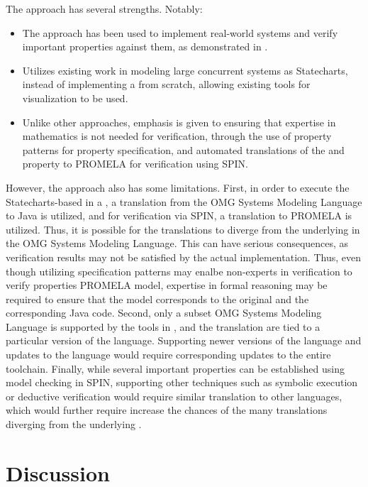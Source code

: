 The \MDA{} approach has several strengths. Notably:
\begin{itemize}
  \item The approach has been used to implement real-world
    systems and verify important properties against them,
    as demonstrated in \cite{PorresECBS08}.
  \item Utilizes existing work in modeling large concurrent
    systems as Statecharts, instead of implementing a \DSL{} from
    scratch, allowing existing tools for visualization to be used.
  \item Unlike other approaches, emphasis is given to ensuring
    that expertise in mathematics is not needed for verification,
    through the use of property patterns for property specification,
    and automated translations of the \BPG{} and property to PROMELA
    for verification using SPIN.
\end{itemize}

However, the approach also has some limitations. First, in order to execute the
Statecharts-based \BPG{} in a \CDSS{}, a translation from the OMG Systems
Modeling Language \cite{OMGSpecUrl} to Java is utilized, and for
verification via SPIN, a translation to PROMELA is utilized. Thus, it
is possible for the translations to diverge from the underlying \BPG{}
in the OMG Systems Modeling Language. This can have serious
consequences, as verification results may not be satisfied by the actual
implementation. Thus, even though utilizing specification patterns
may enalbe non-experts in verification to verify properties PROMELA model,
expertise in formal reasoning may be required to ensure that the model
corresponds to the original \BPG{} and the corresponding Java code.
Second, only a subset OMG Systems Modeling Language is supported
by the tools in \cite{PerezJBI10,PorresECBS08}, and the translation
are tied to a particular version of the language. Supporting newer
versions of the language and updates to the language would require
corresponding updates to the entire toolchain. Finally, while several
important properties can be established using model checking in SPIN,
supporting other techniques such as symbolic execution or deductive
verification would require similar translation to other languages, which
would further require increase the chances of the many translations
diverging from the underlying \BPG{}.

\section{Discussion}

